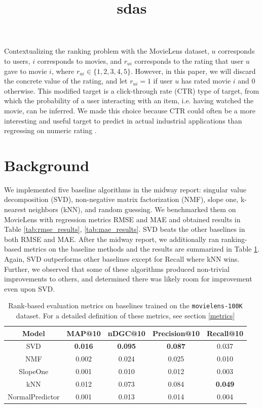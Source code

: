 \documentclass{article}
\begin{document}
Contextualizing the ranking problem with the MovieLens dataset, $u$ corresponds to users, $i$ corresponds to movies, and $r_{ui}$ corresponds to the rating that user $u$ gave to movie $i$, where $r_{ui}\in\{1,2,3,4,5\}$. However, in this paper, we will discard the concrete value of the rating, and let $r_{ui}=1$ if user $u$ has rated movie $i$ and $0$ otherwise. This modified target is a click-through rate (CTR) type of target, from which the probability of a user interacting with an item, i.e. having watched the movie, can be inferred. We made this choice because CTR could often be a more interesting and useful target to predict in actual industrial applications than regressing on numeric rating \cite{ctr}.


\section{Background}


We implemented five baseline algorithms in the midway report: singular value decomposition (SVD), non-negative matrix factorization (NMF), slope one, k-nearest neighbors (kNN), and random guessing. We benchmarked them on MovieLens with regression metrics RMSE and MAE and obtained results in Table \ref{tab:rmse_results}, \ref{tab:mae_results}. SVD beats the other baselines in both RMSE and MAE. After the midway report, we additionally ran ranking-based metrics on the baseline methods and the results are summarized in Table \ref{tab:baseline-ranking-metrics}. Again, SVD outperforms other baselines except for Recall where kNN wins. Further, we observed that some of these algorithms produced non-trivial improvements to others, and determined there was likely room for improvement even upon SVD.

\begin{table}[H]
    \centering
        \begin{tabular}{|c c c c c|} 
         \hline
         Model & MAP@10 & nDGC@10 & Precision@10 & Recall@10 \\ [0.5ex] 
         \hline\hline
         SVD & \bfseries 0.016 & \bfseries 0.095 & \bfseries 0.087 & 0.037 \\
         \hline
         NMF & 0.002 & 0.024 & 0.025 & 0.010 \\ 
         \hline
         SlopeOne & 0.001 & 0.010 & 0.012 & 0.003 \\ 
         \hline
         kNN & 0.012 & 0.073 & 0.084 & \bfseries 0.049 \\ 
         \hline 
         NormalPredictor & 0.001 & 0.013 & 0.014 & 0.004 \\[1ex] 
         \hline
        \end{tabular}
    \title{sdas}
    \caption{Rank-based evaluation metrics on baselines trained on the \texttt{movielens-100K} dataset. For a detailed definition of these metrics, see section \ref{metrics}}
    \label{tab:baseline-ranking-metrics}
\end{table}
\end{document}
